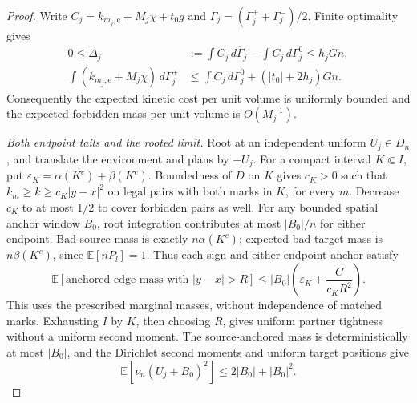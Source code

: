 \documentclass[11pt,reqno]{amsart}
\theoremstyle{definition}
\theoremstyle{remark}
\numberwithin{equation}{section}
\newcommand{\E}{\mathbb E}
\begin{document}
\begin{proof}
Write \(C_j=k_{m_j,\mathrm e}+M_j\chi+t_0g\) and
\(\overline\Gamma_j=(\Gamma_j^++\Gamma_j^-)/2\). Finite
optimality gives
\begin{equation}
\label{degenerate-scalar-diffuse-excess}
 \begin{split}
 0\le\Delta_j
   &:=\int C_j\,d\overline\Gamma_j-\int C_j\,d\Gamma_j^0
       \le h_jGn,\\
 \int(k_{m_j,\mathrm e}+M_j\chi)\,d\Gamma_j^\pm
   &\le\int C_j\,d\Gamma_j^0+(|t_0|+2h_j)Gn.
 \end{split}
\end{equation}
Consequently the expected kinetic cost per unit volume is uniformly
bounded and the expected forbidden mass per unit volume is
\(O(M_j^{-1})\).

\emph{Both endpoint tails and the rooted limit.}
Root at an independent uniform \(U_j\in D_n\), and translate the
environment and plans by \(-U_j\). For a compact interval
\(K\Subset I\), put \(\varepsilon_K=\alpha(K^c)+\beta(K^c)\).
Boundedness of \(D\) on \(K\) gives \(c_K>0\) such that
\(k_m\ge k\ge c_K|y-x|^2\) on legal pairs with both marks in
\(K\), for every \(m\). Decrease \(c_K\) to at most \(1/2\)
to cover forbidden pairs as well. For any bounded spatial anchor
window \(B_0\), root integration contributes at most \(|B_0|/n\)
for either endpoint. Bad-source mass is exactly \(n\alpha(K^c)\);
expected bad-target mass is \(n\beta(K^c)\), since \(\E[nP_l]=1\).
Thus each sign and either endpoint anchor satisfy
\begin{equation}
\label{degenerate-scalar-both-tails}
 \E[\text{anchored edge mass with }|y-x|>R]
 \le |B_0|\left(\varepsilon_K+\frac{C}{c_KR^2}\right).
\end{equation}
This uses the prescribed marginal masses, without independence of
matched marks. Exhausting \(I\) by \(K\), then choosing \(R\),
gives uniform partner tightness without a uniform second moment.
The source-anchored mass is deterministically at most \(|B_0|\), and
the Dirichlet second moments and uniform target positions give
\begin{equation}
\label{degenerate-scalar-target-ui}
             \E[\nu_n(U_j+B_0)^2]\le2|B_0|+|B_0|^2.
\end{equation}


\end{proof}
\end{document}

